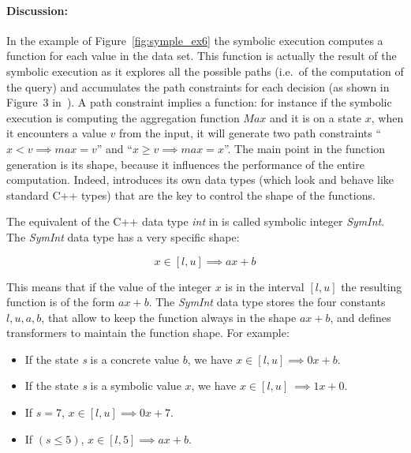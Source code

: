 \begin{refsection}

\paragraph{Discussion:} In the example of Figure~\ref{fig:symple_ex6} the
symbolic execution computes a function for each value in the data set.
%
This function is actually the result of the symbolic execution as it explores
all the possible paths (i.e.\ of the computation of the query) and accumulates
the path constraints for each decision (as shown in Figure~3
in~\cite{Raychev:2015:PUA:2815400.2815418}).
%
A path constraint implies a function: for instance if the symbolic execution
is computing the aggregation function $Max$ and it is on a state $x$, when it
encounters a value $v$ from the input, it will generate two path constraints
``$x < v \implies max = v$'' and ``$x \geq v \implies max = x$''.
%
The main point in the function generation is its shape, because it influences
the performance of the entire computation.
%
Indeed, \symp introduces its own data types (which look and behave like
standard C++ types) that are the key to control the shape of the functions.

The equivalent of the C++ data type \emph{int} in \symp is called symbolic
integer \emph{SymInt}.
%
The \emph{SymInt} data type has a very specific shape:

\begin{equation*}
x \in [l, u] \implies ax+b
\end{equation*}

This means that if the value of the integer $x$ is in the interval $[l,u]$ the
resulting function is of the form $ax+b$.
%
The \emph{SymInt} data type stores the four constants $l, u, a, b$, that allow
to keep the function always in the shape $ax+b$, and defines transformers to
maintain the function shape.
%
For example:

\begin{itemize}
\item If the state \emph{s} is a concrete value $b$, we have $x \in [l, u] \implies 0x+b$.
\item If the state \emph{s} is a symbolic value $x$, we have $x \in [l, u] \ \implies 1x+0$.
\item If $s = 7$, $x \in [l, u] \implies 0x + 7$.
\item If $(s \leq 5)$, $x \in [l, 5] \implies ax + b$.
\end{itemize}


\end{refsection}
